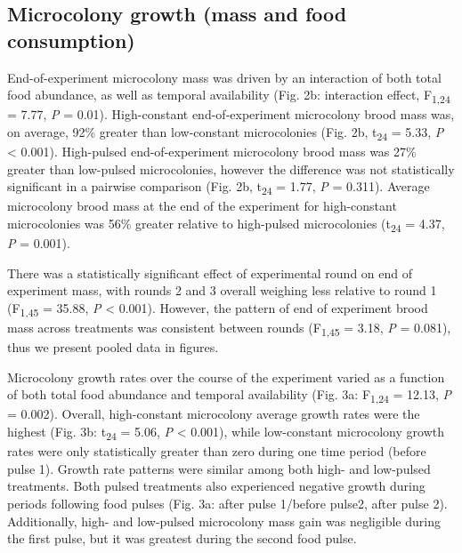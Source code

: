 \documentclass[11pt,]{article}
\begin{document}
\hypertarget{microcolony-growth-mass-and-food-consumption}{%
\subsection{Microcolony growth (mass and food
consumption)}\label{microcolony-growth-mass-and-food-consumption}}

End-of-experiment microcolony mass was driven by an interaction of both
total food abundance, as well as temporal availability (Fig. 2b:
interaction effect, F\textsubscript{1,24} = 7.77, \emph{P} = 0.01).
High-constant end-of-experiment microcolony brood mass was, on average,
92\% greater than low-constant microcolonies (Fig. 2b,
t\textsubscript{24} = 5.33, \emph{P} \textless{} 0.001). High-pulsed
end-of-experiment microcolony brood mass was 27\% greater than
low-pulsed microcolonies, however the difference was not statistically
significant in a pairwise comparison (Fig. 2b, t\textsubscript{24} =
1.77, \emph{P} = 0.311). Average microcolony brood mass at the end of
the experiment for high-constant microcolonies was 56\% greater relative
to high-pulsed microcolonies (t\textsubscript{24} = 4.37, \emph{P} =
0.001).

There was a statistically significant effect of experimental round on
end of experiment mass, with rounds 2 and 3 overall weighing less
relative to round 1 (F\textsubscript{1,45} = 35.88, \emph{P} \textless{}
0.001). However, the pattern of end of experiment brood mass across
treatments was consistent between rounds (F\textsubscript{1,45} = 3.18,
\emph{P} = 0.081), thus we present pooled data in figures.

Microcolony growth rates over the course of the experiment varied as a
function of both total food abundance and temporal availability (Fig.
3a: F\textsubscript{1,24} = 12.13, \emph{P} = 0.002). Overall,
high-constant microcolony average growth rates were the highest (Fig.
3b: t\textsubscript{24} = 5.06, \emph{P} \textless{} 0.001), while
low-constant microcolony growth rates were only statistically greater
than zero during one time period (before pulse 1). Growth rate patterns
were similar among both high- and low-pulsed treatments. Both pulsed
treatments also experienced negative growth during periods following
food pulses (Fig. 3a: after pulse 1/before pulse2, after pulse 2).
Additionally, high- and low-pulsed microcolony mass gain was negligible
during the first pulse, but it was greatest during the second food
pulse.
\end{document}
